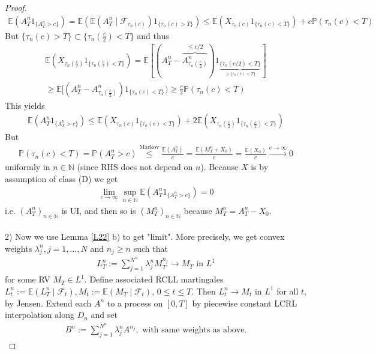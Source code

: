 \documentclass[12pt,a4paper, twoside]{article}
\theoremstyle{definition}
\newcommand{\EE}{\mathbb{E}} %
\newcommand{\PP}{\mathbb{P}} %
\begin{document}
\begin{proof}
\begin{align*}
\EE(A_T^n 1_{\{A_T^n > c\}}) = \EE(\EE(A_T^n \mid \mathcal{F}_{\tau_n(c)}) 1_{\{ \tau_n(c) >T\}}) \leq \EE( X_{\tau_n(c)} 1_{\{ \tau_n(c) < T\}}) + c \PP( \tau_n(c) < T)
\end{align*}
But $\{\tau_n(c) > T\} \subset \{ \tau_n ( \frac{c}{2}) < T\}$ and thus 
\begin{align*}
\EE( X_{\tau_n( \frac{c}{2})} 1_{\{ \tau_n ( \frac{c}{2}) < T \}}) =  \EE[( A_T^n -\overbrace{A_{ \tau_n( \frac{c}{2})}^n}^{ \leq c/2}) 1_{\underbrace{\{ \tau_n (c/2) < T\}}_{ \supset \{ \tau_n(c) < T\}}}] \\
\geq \EE[( A_T^n - A_{\tau_n( \frac{c}{2})}^n) 1_{\{ \tau_n(c) < T\}}) \geq \frac{c}{2} \PP( \tau_n(c) < T)
\end{align*}
This yields 
\begin{align*}
\EE( A_T^n 1_{\{A_T^n >c\}}) \leq \EE( X_{\tau_n(c)} 1_{\{ \tau_n(c) < T\}}) + 2 \EE(X_{\tau_n( \frac{c}{2})} 1_{\{ \tau_n ( \frac{c}{2}) < T\}}) \tag{*}
\end{align*}
But
\begin{align*}
\PP( \tau_n(c) < T) = \PP(A_T^n >c) \overset{\text{Markov}}\leq \frac{\EE(A_T^n)}{c} = \frac{\EE(M_T^n + X_0)}{c} = \frac{\EE(X_0)}{c} \xrightarrow{c \to \infty} 0
\end{align*}
uniformly in $n \in \mathbb{N}$ (since RHS does not depend on $n$). Because $X$ is by assumption of class (D) we get 
\begin{align*}
\lim_{c \to \infty} \sup_{n \in \mathbb{N}} \EE( A_T^n 1_{\{ A_T^n > c\}}) = 0
\end{align*}
i.e. $(A_T^n)_{n \in \mathbb{N}}$ is UI, and then so is $(M_T^n)_{n \in \mathbb{N}}$ because $M_T^n = A_T^n -X_0$. 
\\\\
2) Now we use Lemma \ref{L22} b) to get "limit". More precisely, we get convex weights $\lambda_j^n, j=1, \dots , N$ and $n_j \geq n$ such that 
\begin{align*}
L_T^n := \sum_{j=1}^{N^n} \lambda_j^n M_T^{n_j} \to M_T \text{ in } L^1
\end{align*}
for some RV $M_T \in L^1$. Define associated RCLL martingales $L_t^n := \EE(L_T^n \mid \mathcal{F}_t), M_t:= \EE( M_T \mid \mathcal{F}_t)$, $0 \leq t \leq T$. Then $L_t^n \to M_t$ in $L^1$ for all $t$, by Jensen. Extend each $A^n$ to a process on $[0,T]$ by piecewise constant LCRL interpolation along $D_n$ and set 
\begin{align*}
B^n := \sum_{j=1}^{N^n} \lambda_j^n A^{n_j}, \text{ with same weights as above}. 

\end{align*}
\end{proof}
\end{document}
